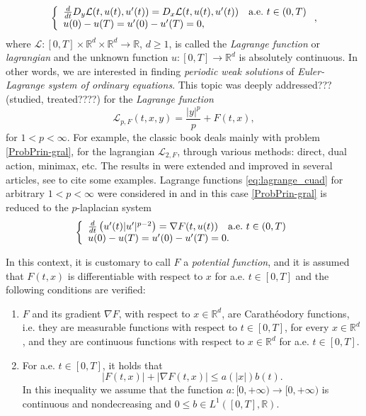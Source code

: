 \documentclass[twoside]{article}
\makeatletter
\theoremstyle{remark}
\newcommand{\labitem}[2]{%
\def\@itemlabel{\textbf{#1}}
\item
\def\@currentlabel{#1}\label{#2}}
\newcommand{\rr}{\mathbb{R}}
\renewcommand{\leq}{\leqslant}
\renewcommand{\geq}{\geqslant}
\newcounter{example}
\makeatother
\begin{document}
\begin{equation}\label{ProbPrin-gral}
    \left\{%
\begin{array}{ll}
  \frac{d}{dt} D_{y}\mathcal{L}(t,u(t),u'(t))= D_{x}\mathcal{L}(t,u(t),u'(t)) \quad \hbox{a.e.}\ t \in (0,T)\\
    u(0)-u(T)=u'(0)-u'(T)=0,
\end{array}%
\right.,
\end{equation}
where $\mathcal{L}:[0,T]\times\rr^d\times\rr^d\to\rr$, $d\geq 1$, is called the \emph{Lagrange function} or \emph{lagrangian} and the unknown function  $u:[0,T]\to\rr^d$ is absolutely continuous. In other words, we are interested in  finding \emph{periodic weak solutions} of \emph{Euler-Lagrange system of ordinary equations}. This topic was deeply addressed???(studied, treated????) for the \emph{Lagrange function}
\begin{equation}\label{eq:lagrange_cuad}
\mathcal{L}_{p,F}(t,x,y)=\frac{|y|^p}{p}+F(t,x),
\end{equation}
for $1<p<\infty$. For example, the classic book  \cite{mawhin2010critical} deals mainly with problem \eqref{ProbPrin-gral}, for the lagrangian $\mathcal{L}_{2,F}$, through various methods: direct, dual action, minimax, etc. The results in \cite{mawhin2010critical} were extended and improved in several articles, see  \cite{tang1995periodic,tang1998periodic,wu1999periodic,tang2001periodic,zhao2004periodic}  to cite some examples. Lagrange functions \eqref{eq:lagrange_cuad} for arbitrary $1<p<\infty$ were considered in  \cite{Tian2007192,tang2010periodic} and in this case \eqref{ProbPrin-gral}  is reduced to the $p$-laplacian system
\begin{equation}\label{ProbP-lapla}
    \left\{%
\begin{array}{ll}
   \frac{d}{dt}\left(u'(t)|u'|^{p-2}\right) = \nabla F(t,u(t)) \quad \hbox{a.e.}\ t \in (0,T)\\
    u(0)-u(T)=u'(0)-u'(T)=0.
\end{array}%
\right.
\end{equation}


In this context, it  is customary to call $F$ a  \emph{potential function}, and it is assumed that $F(t,x)$ is differentiable with respect to $x$ for a.e. $t\in [0,T]$ and the following conditions are verified:
\begin{enumerate}
\labitem{(C)}{item:condicion_c} $F$ and its gradient $\nabla F$, with respect to $x\in\rr^d$,  are  Carath\'eodory functions, i.e. they are measurable functions with respect to $t\in [0,T]$, for every  $x\in\rr^d$, and they are continuous functions with  respect to  $x\in\rr^d$ for a.e. $t \in [0,T]$.
 \labitem{(A)}{item:condicion_a}  For   a.e. $t\in [0,T]$, it holds that
\begin{equation}
|F(t,x)| + |\nabla F(t,x)|  \leq a(|x|)b(t).
\end{equation}
In this inequality we assume that the function  $a:[0,+\infty)\to [0,+\infty)$ is continuous and nondecreasing and $0\leq b\in L^1([0,T],\rr)$.
\end{enumerate}
\end{document}
